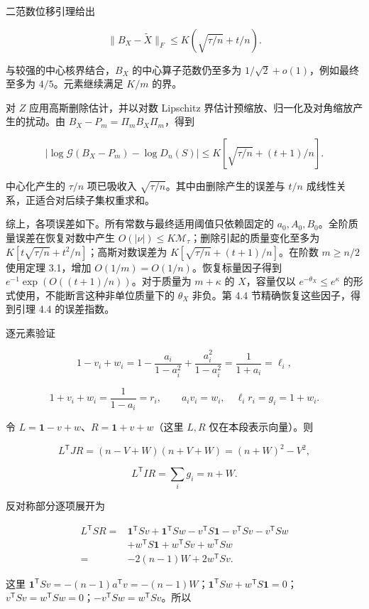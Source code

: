 \documentclass[11pt,a4paper]{article}
\begin{document}
二范数位移引理给出

\[
\|B_X-\widetilde X\|_F\le K(\sqrt{\tau/n}+t/n).
\]

与较强的中心核界结合，\(B_X\) 的中心算子范数仍至多为 \(1/\sqrt2+o(1)\)，例如最终至多为 \(4/5\)。元素继续满足 \(K/m\) 的界。

对 \(Z\) 应用高斯删除估计，并以对数 Lipschitz 界估计预缩放、归一化及对角缩放产生的扰动。由 \(B_X-P_m=\Pi_mB_X\Pi_m\)，得到

\[
|\log\mathcal G(B_X-P_m)-\log D_n(S)|\le K\left[\sqrt{\tau/n}+(t+1)/n\right].
\]

中心化产生的 \(\tau/n\) 项已吸收入 \(\sqrt{\tau/n}\)。其中由删除产生的误差与 \(t/n\) 成线性关系，正适合对后续子集权重求和。

综上，各项误差如下。所有常数与最终适用阈值只依赖固定的 \(a_0,A_0,B_0\)。全阶质量误差在恢复对数中产生 \(O(|\nu|)\le K\mathcal M_\tau\)；删除引起的质量变化至多为 \(K[t\sqrt{\tau/n}+t^2/n]\)；高斯对数误差为 \(K[\sqrt{\tau/n}+(t+1)/n]\)。在阶数 \(m\ge n/2\) 使用定理 3.1，增加 \(O(1/m)=O(1/n)\)。恢复标量因子得到 \(e^{-1}\exp(O((t+1)/n))\)。对于质量为 \(m+\kappa\) 的 \(X\)，容量仅以 \(e^{-\theta_X}\le e^\kappa\) 的形式使用，不能断言这种非单位质量下的 \(\theta_X\) 非负。第 4.4 节精确恢复这些因子，得到引理 4.4 的误差指数。

逐元素验证

\[
1-v_i+w_i=1-\frac{a_i}{1-a_i^2}+\frac{a_i^2}{1-a_i^2}
=\frac1{1+a_i}=\ell_i,
\]

\[
1+v_i+w_i=\frac1{1-a_i}=r_i,\qquad
a_iv_i=w_i,\quad \ell_ir_i=g_i=1+w_i.
\]

令 \(L=\mathbf1-v+w\)、\(R=\mathbf1+v+w\)（这里 \(L,R\) 仅在本段表示向量）。则

\[
L^{\mathsf T}JR=(n-V+W)(n+V+W)=(n+W)^2-V^2,
\]

\[
L^{\mathsf T}IR=\sum_i g_i=n+W.
\]

反对称部分逐项展开为

\[
\begin{aligned}
L^{\mathsf T}SR
={}&\mathbf1^{\mathsf T}Sv+\mathbf1^{\mathsf T}Sw
-v^{\mathsf T}S\mathbf1-v^{\mathsf T}Sv-v^{\mathsf T}Sw\\
&+w^{\mathsf T}S\mathbf1+w^{\mathsf T}Sv+w^{\mathsf T}Sw\\
={}&-2(n-1)W+2w^{\mathsf T}Sv.
\end{aligned}
\]

这里 \(\mathbf1^{\mathsf T}Sv=-(n-1)a^{\mathsf T}v=-(n-1)W\)；\(\mathbf1^{\mathsf T}Sw+w^{\mathsf T}S\mathbf1=0\)；\(v^{\mathsf T}Sv=w^{\mathsf T}Sw=0\)；\(-v^{\mathsf T}Sw=w^{\mathsf T}Sv\)。所以
\end{document}
